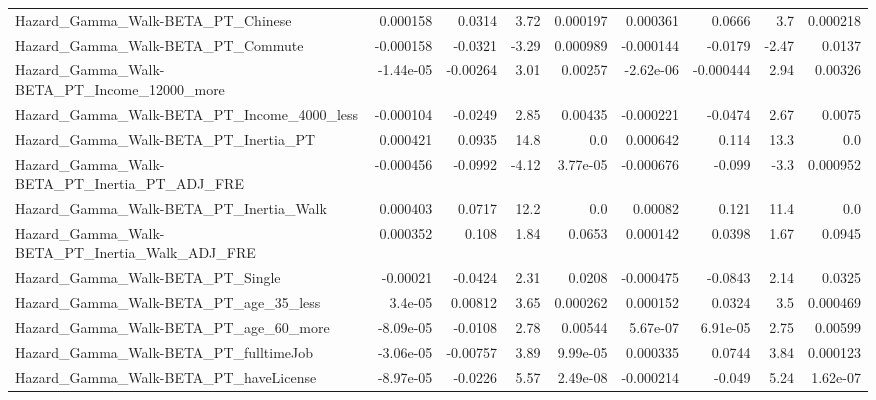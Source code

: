 \begin{tabular}{lrrrrrrrr}
Hazard\_Gamma\_Walk-BETA\_PT\_Chinese                  &    0.000158 &       0.0314 &     3.72 & 0.000197 &   0.000361 &      0.0666 &          3.7 &      0.000218 \\
Hazard\_Gamma\_Walk-BETA\_PT\_Commute                  &   -0.000158 &      -0.0321 &    -3.29 & 0.000989 &  -0.000144 &     -0.0179 &        -2.47 &        0.0137 \\
Hazard\_Gamma\_Walk-BETA\_PT\_Income\_12000\_more        &   -1.44e-05 &     -0.00264 &     3.01 &  0.00257 &  -2.62e-06 &   -0.000444 &         2.94 &       0.00326 \\
Hazard\_Gamma\_Walk-BETA\_PT\_Income\_4000\_less         &   -0.000104 &      -0.0249 &     2.85 &  0.00435 &  -0.000221 &     -0.0474 &         2.67 &        0.0075 \\
Hazard\_Gamma\_Walk-BETA\_PT\_Inertia\_PT               &    0.000421 &       0.0935 &     14.8 &      0.0 &   0.000642 &       0.114 &         13.3 &           0.0 \\
Hazard\_Gamma\_Walk-BETA\_PT\_Inertia\_PT\_ADJ\_FRE       &   -0.000456 &      -0.0992 &    -4.12 & 3.77e-05 &  -0.000676 &      -0.099 &         -3.3 &      0.000952 \\
Hazard\_Gamma\_Walk-BETA\_PT\_Inertia\_Walk             &    0.000403 &       0.0717 &     12.2 &      0.0 &    0.00082 &       0.121 &         11.4 &           0.0 \\
Hazard\_Gamma\_Walk-BETA\_PT\_Inertia\_Walk\_ADJ\_FRE     &    0.000352 &        0.108 &     1.84 &   0.0653 &   0.000142 &      0.0398 &         1.67 &        0.0945 \\
Hazard\_Gamma\_Walk-BETA\_PT\_Single                   &    -0.00021 &      -0.0424 &     2.31 &   0.0208 &  -0.000475 &     -0.0843 &         2.14 &        0.0325 \\
Hazard\_Gamma\_Walk-BETA\_PT\_age\_35\_less              &     3.4e-05 &      0.00812 &     3.65 & 0.000262 &   0.000152 &      0.0324 &          3.5 &      0.000469 \\
Hazard\_Gamma\_Walk-BETA\_PT\_age\_60\_more              &   -8.09e-05 &      -0.0108 &     2.78 &  0.00544 &   5.67e-07 &    6.91e-05 &         2.75 &       0.00599 \\
Hazard\_Gamma\_Walk-BETA\_PT\_fulltimeJob              &   -3.06e-05 &     -0.00757 &     3.89 & 9.99e-05 &   0.000335 &      0.0744 &         3.84 &      0.000123 \\
Hazard\_Gamma\_Walk-BETA\_PT\_haveLicense              &   -8.97e-05 &      -0.0226 &     5.57 & 2.49e-08 &  -0.000214 &      -0.049 &         5.24 &      1.62e-07 \\

\end{tabular}
